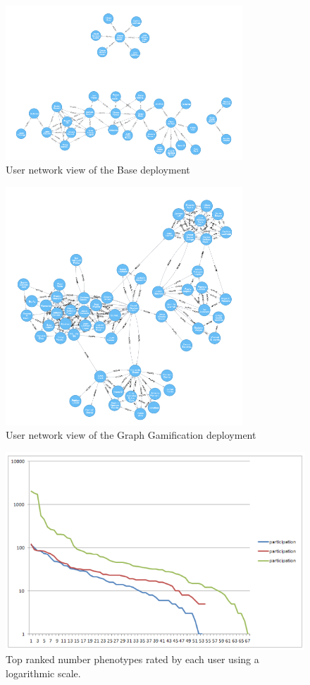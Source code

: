 \documentclass[conference]{IEEEtran}
\begin{document}
\begin{figure}[!t]
    \centering
        \includegraphics[width=3.5in]{img/user_known_2.png}
    \caption{User network view of the Base deployment}
    \label{fig:B-network}
\end{figure}
\begin{figure}[!t]
    \centering
        \includegraphics[width=3.5in]{img/user_known_3.png}
    \caption{User network view of the Graph Gamification deployment}
    \label{fig:GG-network}
\end{figure}
\begin{figure}[!t]
    \centering
        \includegraphics[width=5.5in]{img/comparison.png}
    \caption{Top ranked number phenotypes rated by each user using a
     logarithmic scale.} %
    \label{fig:top-ranked-participation}
\end{figure}
\end{document}
